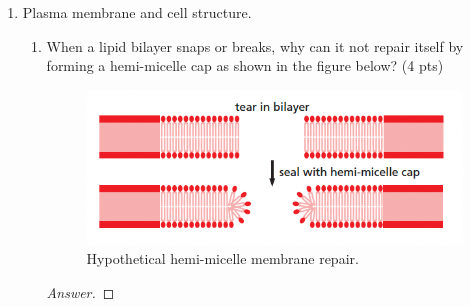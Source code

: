 \documentclass[../psets.tex]{subfiles}
\begin{document}
\begin{enumerate}
\begin{proof}[Answer]
        We want to find the smallest $n$ such that a sequence of length $n$ occurs at most once. Thus, mathematically, we want to find the smallest $n\in\mathbb{N}$ such that
        \begin{equation*}
            \num{3e9}\cdot\frac{1}{4^n} \leq 1
            \quad\Longleftrightarrow\quad
            \log_4(\num{3e9}) \approx 15.74 \leq n
        \end{equation*}
        Therefore,
        \begin{equation*}
            \boxed{n = 16}
        \end{equation*}
    \end{proof}
    \item Plasma membrane and cell structure.
    \begin{enumerate}
        \item When a lipid bilayer snaps or breaks, why can it not repair itself by forming a hemi-micelle cap as shown in the figure below? (4 pts)
        \begin{figure}[h!]
            \centering
            \includegraphics[width=0.4\linewidth]{../ExtFiles/pset3-hemiMicelle.png}
            \caption{Hypothetical hemi-micelle membrane repair.}
            \label{fig:pset3-hemiMicelle}
        \end{figure}
        \begin{proof}[Answer]


\end{proof}
\end{enumerate}
\end{enumerate}
\end{document}
